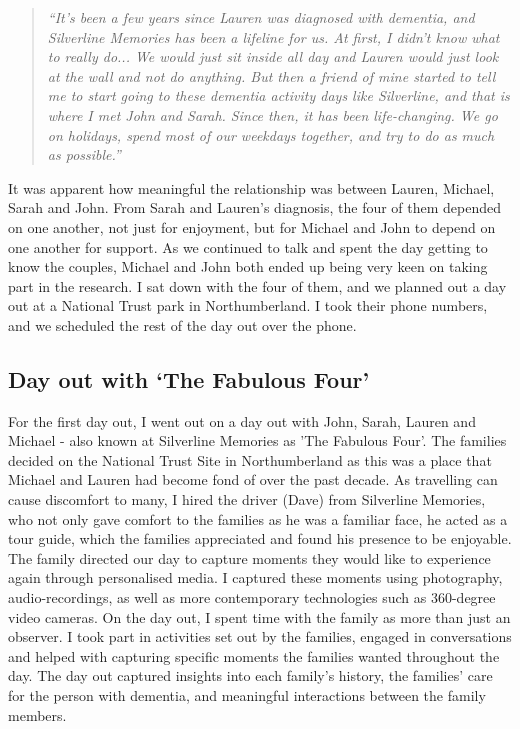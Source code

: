 \begin{quote}
\textit{``It's been a few years since Lauren was diagnosed with dementia, and Silverline Memories has been a lifeline for us. At first, I didn't know what to really do... We would just sit inside all day and Lauren would just look at the wall and not do anything. But then a friend of mine started to tell me to start going to these dementia activity days like Silverline, and that is where I met John and Sarah. Since then, it has been life-changing. We go on holidays, spend most of our weekdays together, and try to do as much as possible.''
}    
\end{quote}

It was apparent how meaningful the relationship was between Lauren, Michael, Sarah and John. From Sarah and Lauren's diagnosis, the four of them depended on one another, not just for enjoyment, but for Michael and John to depend on one another for support. As we continued to talk and spent the day getting to know the couples, Michael and John both ended up being very keen on taking part in the research. I sat down with the four of them, and we planned out a day out at a National Trust park in Northumberland. I took their phone numbers, and we scheduled the rest of the day out over the phone.

\subsection{Day out with `The Fabulous Four'}
\label{DayOutOne}
For the first day out, I went out on a day out with John, Sarah, Lauren and Michael - also known at Silverline Memories as 'The Fabulous Four'. The families decided on the National Trust Site in Northumberland as this was a place that Michael and Lauren had become fond of over the past decade. As travelling can cause discomfort to many, I hired the driver (Dave) from Silverline Memories, who not only gave comfort to the families as he was a familiar face, he acted as a tour guide, which the families appreciated and found his presence to be enjoyable. The family directed our day to capture moments they would like to experience again through personalised media. I captured these moments using photography, audio-recordings, as well as more contemporary technologies such as 360-degree video cameras. On the day out, I spent time with the family as more than just an observer. I took part in activities set out by the families, engaged in conversations and helped with capturing specific moments the families wanted throughout the day. The day out captured insights into each family’s history, the families’ care for the person with dementia, and meaningful interactions between the family members.

